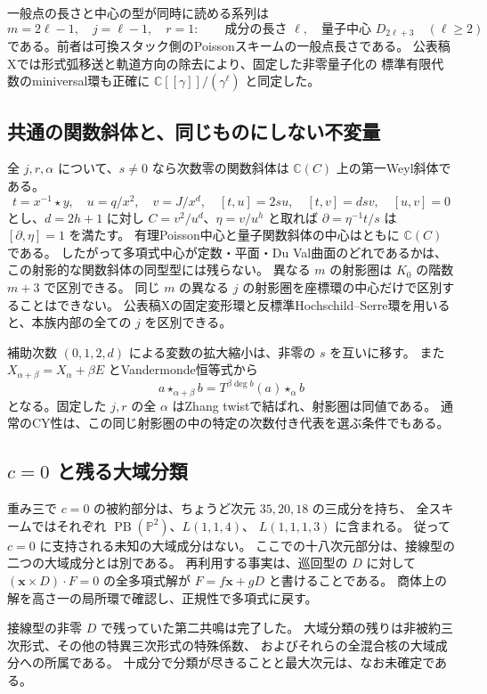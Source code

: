 一般点の長さと中心の型が同時に読める系列は
\[
 m=2\ell-1,\quad j=\ell-1,\quad r=1:\qquad
 \text{成分の長さ }\ell,\quad \text{量子中心 }D_{2\ell+3}\quad(\ell\ge2)
\]
である。前者は可換スタック側のPoissonスキームの一般点長さである。
公表稿Xでは形式弧移送と軌道方向の除去により、固定した非零量子化の
標準有限代数のminiversal環も正確に $\mathbb C[[\gamma]]/(\gamma^\ell)$ と同定した。

\subsection{共通の関数斜体と、同じものにしない不変量}

全 $j,r,\alpha$ について、$s\ne0$ なら次数零の関数斜体は
$\mathbb C(C)$ 上の第一Weyl斜体である。
\[
 t=x^{-1}\star y,\quad u=q/x^2,\quad v=J/x^d,\quad
 [t,u]=2su,\quad[t,v]=dsv,\quad[u,v]=0
\]
とし、$d=2h+1$ に対し $C=v^2/u^d$、$\eta=v/u^h$ と取れば
$\partial=\eta^{-1}t/s$ は $[\partial,\eta]=1$ を満たす。
有理Poisson中心と量子関数斜体の中心はともに $\mathbb C(C)$ である。
したがって多項式中心が定数・平面・Du Val曲面のどれであるかは、
この射影的な関数斜体の同型型には残らない。
異なる $m$ の射影圏は $K_0$ の階数 $m+3$ で区別できる。
同じ $m$ の異なる $j$ の射影圏を座標環の中心だけで区別することはできない。
公表稿Xの固定変形環と反標準Hochschild--Serre環を用いると、本族内部の全ての $j$ を区別できる。

補助次数 $(0,1,2,d)$ による変数の拡大縮小は、非零の $s$ を互いに移す。
また $X_{\alpha+\beta}=X_\alpha+\beta E$ とVandermonde恒等式から
\[
 a\star_{\alpha+\beta}b=T^{\beta\deg b}(a)\star_\alpha b
\]
となる。固定した $j,r$ の全 $\alpha$ はZhang twistで結ばれ、射影圏は同値である。
通常のCY性は、この同じ射影圏の中の特定の次数付き代表を選ぶ条件でもある。

\subsection{$c=0$ と残る大域分類}

重み三で $c=0$ の被約部分は、ちょうど次元 $35,20,18$ の三成分を持ち、
全スキームではそれぞれ $\operatorname{PB}(\mathbb P^2)$、$L(1,1,4)$、
$L(1,1,1,3)$ に含まれる。
従って $c=0$ に支持される未知の大域成分はない。
ここでの十八次元部分は、接線型の二つの大域成分とは別である。
再利用する事実は、巡回型の $D$ に対して
$(\mathbf x\times D)\cdot F=0$ の全多項式解が $F=f\mathbf x+gD$ と書けることである。
商体上の解を高さ一の局所環で確認し、正規性で多項式に戻す。

接線型の非零 $D$ で残っていた第二共鳴は完了した。
大域分類の残りは非被約三次形式、その他の特異三次形式の特殊係数、
およびそれらの全混合核の大域成分への所属である。
十成分で分類が尽きることと最大次元は、なお未確定である。
